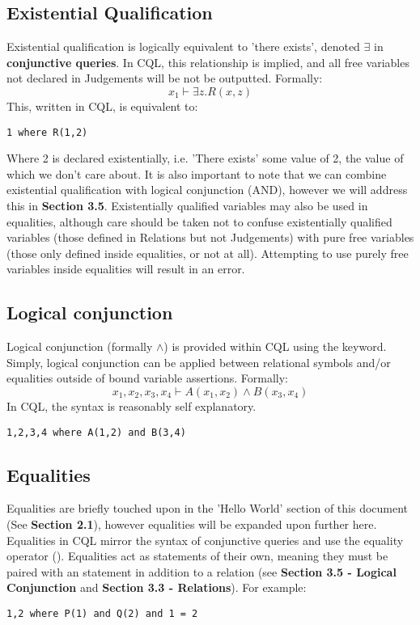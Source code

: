 \subsection{Existential Qualification}
Existential qualification is logically equivalent to 'there exists', denoted $\exists$ in \textbf{conjunctive queries}. In CQL, this relationship is implied, and all free variables not declared in Judgements will be not be outputted. Formally:
$$ x_1 \vdash \exists z.R(x,z) $$
This, written in CQL, is equivalent to:
\begin{lstlisting}[style=framed]
1 where R(1,2)
\end{lstlisting}
Where 2 is declared existentially, i.e. 'There exists' some value of 2, the value of which we don't care about. It is also important to note that we can combine existential qualification with logical conjunction (AND), however we will address this in \textbf{Section 3.5}. Existentially qualified variables may also be used in equalities, although care should be taken not to confuse existentially qualified variables (those defined in Relations but not Judgements) with pure free variables (those only defined inside equalities, or not at all). Attempting to use purely free variables inside equalities will result in an  error.


\subsection{Logical conjunction}
Logical conjunction (formally $\land$) is provided within CQL using the  keyword. Simply, logical conjunction can be applied between relational symbols and/or equalities outside of bound variable assertions. Formally:
$$x_1, x_2, x_3, x_4 \vdash A(x_1, x_2)  \land B(x_3, x_4)$$
In CQL, the syntax is reasonably self explanatory.
\begin{lstlisting}[style=framed]
1,2,3,4 where A(1,2) and B(3,4)
\end{lstlisting}
\subsection{Equalities}
Equalities are briefly touched upon in the 'Hello World' section of this document (See \textbf{Section 2.1}), however equalities will be expanded upon further here. Equalities in CQL mirror the syntax of conjunctive queries and use the equality operator (\codeword{=}). Equalities act as statements of their own, meaning they must be paired with an  statement in addition to a relation (see \textbf{Section 3.5 - Logical Conjunction} and \textbf{Section 3.3 - Relations}). For example:
\begin{lstlisting}[style=framed]
1,2 where P(1) and Q(2) and 1 = 2
\end{lstlisting}

